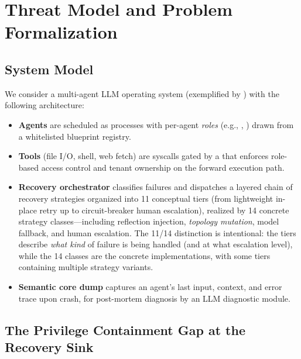 
\section{Threat Model and Problem Formalization}
\label{sec:threat-model}

\subsection{System Model}

We consider a multi-agent LLM operating system (exemplified by \system{}) with the following architecture:
\begin{itemize}[leftmargin=*]
    \item \textbf{Agents} are scheduled as processes with per-agent \emph{roles} (e.g., , ) drawn from a whitelisted blueprint registry.
    \item \textbf{Tools} (file I/O, shell, web fetch) are syscalls gated by a  that enforces role-based access control and tenant ownership on the forward execution path.
    \item \textbf{Recovery orchestrator} classifies failures and dispatches a layered chain of recovery strategies organized into 11 conceptual tiers (from lightweight in-place retry up to circuit-breaker human escalation), realized by 14 concrete strategy classes---including reflection injection, \emph{topology mutation}, model fallback, and human escalation. The 11/14 distinction is intentional: the tiers describe \emph{what kind} of failure is being handled (and at what escalation level), while the 14 classes are the concrete implementations, with some tiers containing multiple strategy variants.
    \item \textbf{Semantic core dump} captures an agent's last input, context, and error trace upon crash, for post-mortem diagnosis by an LLM diagnostic module.
\end{itemize}

\subsection{The Privilege Containment Gap at the Recovery Sink}

